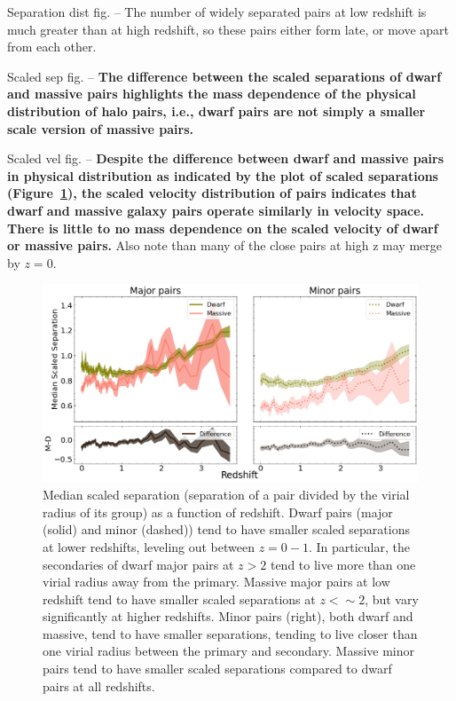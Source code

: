 \documentclass[twocolumn]{aastex631}
\begin{document}
Separation dist fig. -- The number of widely separated pairs at low redshift is much greater than at high redshift, so these pairs either form late, or move apart from each other. 

Scaled sep fig. -- \textbf{The difference between the scaled separations of dwarf and massive pairs highlights the mass dependence of the physical distribution of halo pairs, i.e., dwarf pairs are not simply a smaller scale version of massive pairs.}

Scaled vel fig. --   \textbf{Despite the difference between dwarf and massive pairs in physical distribution as indicated by the plot of scaled separations (Figure~\ref{fig:sep-scaled}), the scaled velocity distribution of pairs indicates that dwarf and massive galaxy pairs operate similarly in velocity space. There is little to no mass dependence on the scaled velocity of dwarf or massive pairs.}
Also note than many of the close pairs at high z may merge by $z=0$.

\begin{figure}[htp]
  \centering
  \includegraphics[width=\textwidth]{scaledsep.png}
  \caption{Median scaled separation (separation of a pair divided by the virial radius of its group) as a function of redshift. Dwarf pairs (major (solid) and minor (dashed)) tend to have smaller scaled separations at lower redshifts, leveling out between $z=0-1$. In particular, the secondaries of dwarf major pairs at $z>2$ tend to live more than one virial radius away from the primary. Massive major pairs at low redshift tend to have smaller scaled separations  at $z<\sim2$, but vary significantly at higher redshifts. 
  Minor pairs (right), both dwarf and massive, tend to have smaller separations, tending to live closer than one virial radius between the primary and secondary. Massive minor pairs tend to have smaller scaled separations compared to dwarf pairs at all redshifts.
    }
  \label{fig:sep-scaled}
\end{figure}
\end{document}
